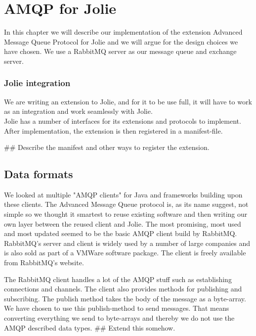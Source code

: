 \section{AMQP for Jolie}
In this chapter we will describe our implementation of the extension Advanced Message Queue Protocol for Jolie and we will argue for the design choices we have chosen. We use a RabbitMQ\cite{RabbitMQ} server as our message queue and exchange server.
\subsubsection{Jolie integration}
We are writing an extension to Jolie, and for it to be use full, it will have to work as an integration and work seamlessly with Jolie.\\
Jolie has a number of interfaces for its extensions and protocols to implement. After implementation, the extension is then registered in a manifest-file.

\#\# Describe the manifest and other ways to register the extension.
\subsection{Data formats}
We looked at multiple "AMQP clients" for Java and frameworks building upon these clients. The Advanced Message Queue protocol is, as its name suggest, not simple so we thought it smartest to reuse existing software and then writing our own layer between the reused client and Jolie. The most promising, most used and most updated seemed to be the basic AMQP client build by RabbitMQ\cite{RabbitMqClient}. RabbitMQ's server and client is widely used by a number of large companies and is also sold as part of a VMWare software package\cite{vFabric}. The client is freely available from RabbitMQ's website.

The RabbitMQ client handles a lot of the AMQP stuff such as establishing connections and channels. The client also provides methods for publishing and subscribing. The publish method takes the body of the message as a byte-array. We have chosen to use this publish-method to send messages. That means converting everything we send to byte-arrays and thereby we do not use the AMQP described data types. \#\# Extend this somehow.
